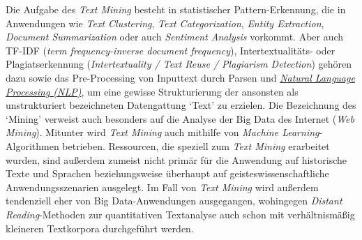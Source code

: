 \documentclass{article}
\begin{document}
        Die Aufgabe des \emph{Text Mining} besteht in statistischer Pattern-Erkennung, die in Anwendungen wie \emph{Text Clustering}, \emph{Text Categorization}, \emph{Entity Extraction}, \emph{Document Summarization} oder auch \emph{Sentiment Analysis} vorkommt. Aber auch TF-IDF (\emph{term frequency-inverse document frequency}), Intertextualitäts- oder Plagiatserkennung (\emph{Intertextuality / Text Reuse / Plagiarism Detection}) gehören dazu sowie das Pre-Processing von Inputtext durch Parsen und \emph{\href{http://gams.uni-graz.at/o:konde.145}{Natural Language Processing (NLP)}}, um eine gewisse Strukturierung der ansonsten als  unstrukturiert bezeichneten Datengattung ‘Text’ zu erzielen. Die Bezeichnung des ‘Mining’ verweist auch besonders auf die Analyse der Big Data des Internet (\emph{Web Mining}). Mitunter wird \emph{Text Mining} auch mithilfe von \emph{Machine Learning}-Algorithmen betrieben. Ressourcen, die speziell zum \emph{Text Mining} erarbeitet wurden, sind außerdem zumeist nicht primär für die Anwendung auf historische Texte und Sprachen beziehungsweise  überhaupt auf geisteswissenschaftliche Anwendungsszenarien ausgelegt. Im Fall von \emph{Text Mining} wird außerdem tendenziell eher von Big Data-Anwendungen ausgegangen, wohingegen \emph{Distant Reading}-Methoden zur quantitativen Textanalyse auch schon mit verhältnismäßig kleineren Textkorpora durchgeführt werden. \\
            
\end{document}
